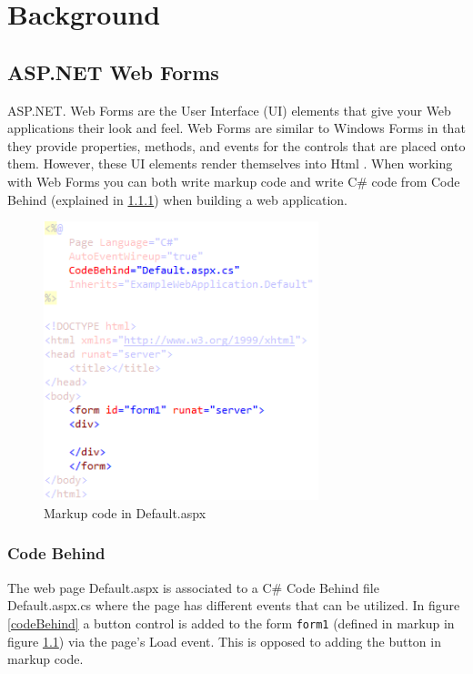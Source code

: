 \chapter{Background}

\section{ASP.NET Web Forms} %
\label{sec:asp_net_web_forms}
	ASP.NET. Web Forms are the User Interface (UI) elements that give your Web applications their look and feel. Web Forms are similar to Windows Forms \cite{msdn01} in that they provide properties, methods, and events for the controls that are placed onto them. However, these UI elements render themselves into Html \cite{msdn02}. When working with Web Forms you can both write markup code and write C\# code from Code Behind (explained in \ref{sub:code_behind}) when building a web application. 

	\begin{figure}[H]
					\includegraphics[width=8cm]{resources/images/Markup.png}
				\caption{Markup code in Default.aspx}
				\label{markup}
			\end{figure}

	\subsection{Code Behind} %
	\label{sub:code_behind}
		The web page Default.aspx is associated to a C\# Code Behind file Default.aspx.cs where the page has different events that can be utilized. In figure \ref{codeBehind} a button control is added to the form \texttt{form1} (defined in markup in figure \ref{markup}) via the page’s Load event. This is opposed to adding the button in markup code.


